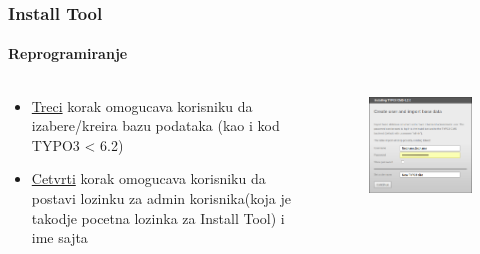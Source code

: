 
\begin{frame}[fragile]
	\frametitle{Install Tool}
	\framesubtitle{Reprogramiranje}

	\begin{columns}[T]

		\begin{column}{.5\textwidth}
			\begin{itemize}
				\item \underline{Treci} korak omogucava korisniku da izabere/kreira bazu podataka\newline
					(kao i kod TYPO3 < 6.2)
				\item \underline{Cetvrti} korak omogucava korisniku da postavi lozinku za admin korisnika\newline (koja je takodje pocetna lozinka za Install Tool) i ime sajta
			\end{itemize}
		\end{column}

		\begin{column}{.5\textwidth}
			\begin{figure}\vspace*{-0.4cm}
				\includegraphics[width=0.8\linewidth]{Images/InstallTool/AdminPasswordAndSiteName.png}
			\end{figure}
		\end{column}

	\end{columns}

\end{frame}

